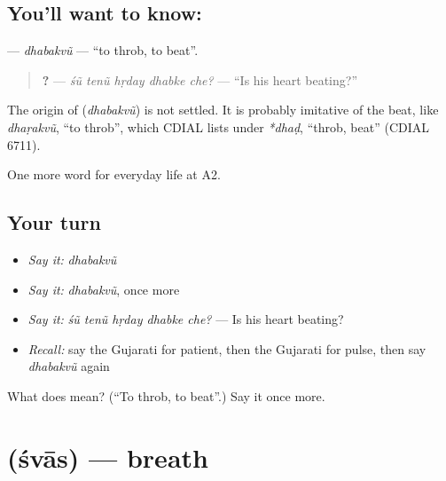 \subsection*{You'll want to know: }
\textbf{} — \emph{dhabakvũ} — \textquotedblleft{}to throb, to beat\textquotedblright{}.

\begin{quote}
\textbf{    ?} — \emph{śũ tenũ hṛday dhabke che?} — \textquotedblleft{}Is his heart beating?\textquotedblright{}
\end{quote}

\begin{cousinweb}
The origin of \textbf{} (\emph{dhabakvũ}) is not settled. It is probably imitative of the beat, like \emph{dhaṛakvũ}, \textquotedblleft{}to throb\textquotedblright{}, which CDIAL lists under \emph{*dhaḍ}, \textquotedblleft{}throb, beat\textquotedblright{} (CDIAL 6711).
\end{cousinweb}

\begin{grammarlens}[title={What you've built}]
One more word for everyday life at A2.
\end{grammarlens}

\subsection*{Your turn}
\begin{itemize}
\raggedright
  \item \emph{Say it:} \emph{dhabakvũ}
  \item \emph{Say it:} \emph{dhabakvũ}, once more
  \item \emph{Say it:} \emph{śũ tenũ hṛday dhabke che?} — Is his heart beating?
  \item \emph{Recall:} say the Gujarati for patient, then the Gujarati for pulse, then say \emph{dhabakvũ} again
\end{itemize}

\begin{tcolorbox}[breakable,colback=teal!4,colframe=teal!35!black,title={Before you move on}]
What does  mean? (\textquotedblleft{}To throb, to beat\textquotedblright{}.) Say it once more.
\end{tcolorbox}
\section[\texorpdfstring{\gu{શ્વાસ} (śvās)}{શ્વાસ (śvās)}]{ (śvās) — breath}

